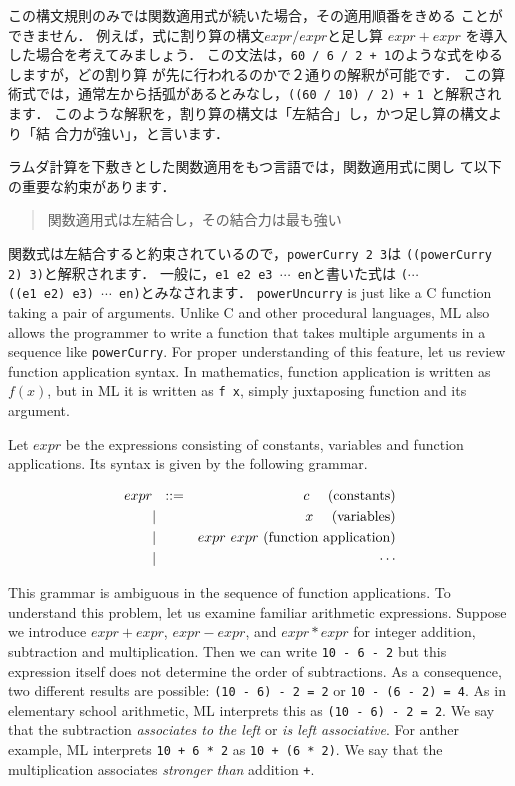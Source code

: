 \documentclass{jbook}
\newcommand{\myem}{\mbox{\ \ }}
\begin{document}
	この構文規則のみでは関数適用式が続いた場合，その適用順番をきめる
ことができません．
	例えば，式に割り算の構文$expr / expr$と足し算
$expr + expr$
を導入した場合を考えてみましょう．
	この文法は，{\tt 60 / 6 / 2 + 1}のような式をゆるしますが，どの割り算
が先に行われるのかで２通りの解釈が可能です．
	この算術式では，通常左から括弧があるとみなし，{\tt ((60 / 10) /
2) + 1 }と解釈されます．
	このような解釈を，割り算の構文は「左結合」し，かつ足し算の構文より「結
合力が強い」，と言います．

	ラムダ計算を下敷きとした関数適用をもつ言語では，関数適用式に関し
て以下の重要な約束があります．
\begin{quote}
関数適用式は左結合し，その結合力は最も強い
\end{quote}
	関数式は左結合すると約束されているので，{\tt powerCurry 2 3}は
{\tt ((powerCurry 2) 3)}と解釈されます．
	一般に，{\tt e1\ e2\ e3\ $\cdots$\ en}と書いた式は
{\tt ($\cdots$ ((e1\ e2)\ e3)\ $\cdots$\ en)}とみなされます．
\else%
	{\tt powerUncurry} is just like a C function taking a pair of
arguments.
	Unlike C and other procedural languages, ML also allows the
programmer to write a function that takes multiple arguments in a
sequence like {\tt powerCurry}.
	For proper understanding of this feature, let us review function
application syntax.
	In mathematics, function application is written as $f(x)$,
but in ML it is written as {\tt f x}, simply juxtaposing function and its
argument. 

	Let $expr$ be the expressions consisting of constants, variables
and function applications.
	Its syntax is given by the following grammar.
\begin{tt}
\begin{eqnarray*}
expr &\mbox{\ \ }::=& c                  \mbox{\myem\myem (constants)} \\
     &|& x                    \mbox{\myem\myem (variables)} \\
     &|& expr\mbox{\ } expr   \mbox{\ (function application)} \\
     &|& \cdots
\end{eqnarray*}
\end{tt}

	This grammar is ambiguous in the sequence of function
applications.
	To understand this problem, let us examine familiar arithmetic
expressions.
	Suppose we introduce 
$expr + expr$,
$expr - expr$, and
$expr * expr$
for integer addition, subtraction and multiplication.
	Then we can write {\tt 10 - 6 - 2} but this expression
itself does not determine the order of subtractions.
	As a consequence, two different results are possible:
{\tt (10 - 6) - 2 = 2} 
or
{\tt 10 - (6 - 2) = 4}.
	As in elementary school arithmetic, ML interprets this 
as {\tt (10 - 6) - 2 = 2}.
	We say that the subtraction {\em associates to the left} or
{\em is left associative}.
	For anther example, ML interprets {\tt 10 + 6 * 2} as {\tt 10
+ (6 * 2)}.
	We say that the multiplication {\tt *} associates {\em stronger
than} addition {\tt +}.
	
\end{document}

